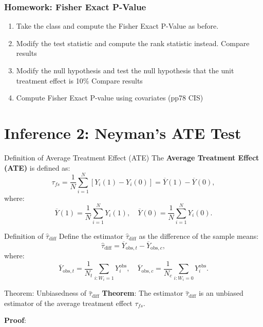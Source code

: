 \documentclass[xcolor=svgnames,t]{beamer}
\begin{document}
\begin{frame}
    \frametitle{Homework: Fisher Exact P-Value}
    \begin{enumerate}
        \item Take the class and compute the Fisher Exact P-Value as before.
        \item Modify the test statistic and compute the rank statistic instead. Compare results
        \item Modify the null hypothesis and test the null hypothesis that the unit treatment effect is 10\% Compare results
        \item Compute Fisher Exact P-value using covariates (pp78 CIS)
    \end{enumerate}
\end{frame}
\section{Inference  2: Neyman's ATE Test}
\begin{frame}{Definition of Average Treatment Effect (ATE)}
    The \textbf{Average Treatment Effect (ATE)} is defined as:
    \[
    \tau_{fs} = \frac{1}{N} \sum_{i=1}^{N} \left[ Y_i(1) - Y_i(0) \right] = \overline{Y}(1) - \overline{Y}(0),
    \]
    where:
    \[
    \overline{Y}(1) = \frac{1}{N} \sum_{i=1}^{N} Y_i(1), \quad \overline{Y}(0) = \frac{1}{N} \sum_{i=1}^{N} Y_i(0).
    \]
    
    \vspace{2cm} %
    
    \end{frame}
    
    \begin{frame}{Definition of $\hat{\tau}_{\text{diff}}$}
    Define the estimator $\hat{\tau}_{\text{diff}}$ as the difference of the sample means:
    \[
    \hat{\tau}_{\text{diff}} = \overline{Y}_{\text{obs}, t} - \overline{Y}_{\text{obs}, c},
    \]
    where:
    \[
    \overline{Y}_{\text{obs}, t} = \frac{1}{N_t} \sum_{i: W_i=1} Y^{\text{obs}}_i, \quad \overline{Y}_{\text{obs}, c} = \frac{1}{N_c} \sum_{i: W_i=0} Y^{\text{obs}}_i.
    \]
    
    \vspace{2cm} %
    
    \end{frame}
    
    \begin{frame}{Theorem: Unbiasedness of $\hat{\tau}_{\text{diff}}$}
    \textbf{Theorem}: The estimator $\hat{\tau}_{\text{diff}}$ is an unbiased estimator of the average treatment effect $\tau_{fs}$.
    
    \vspace{0.5cm} %
    
    \textbf{Proof}:
    
    \vspace{4cm} %
    
    \end{frame}
    
\end{document}
